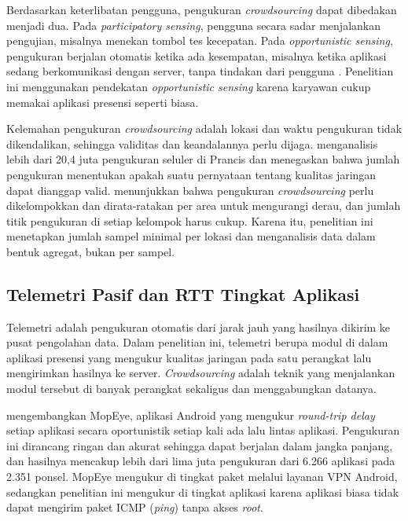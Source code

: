Berdasarkan keterlibatan pengguna, pengukuran \textit{crowdsourcing} dapat dibedakan menjadi dua. Pada \textit{participatory sensing}, pengguna secara sadar menjalankan pengujian, misalnya menekan tombol tes kecepatan. Pada \textit{opportunistic sensing}, pengukuran berjalan otomatis ketika ada kesempatan, misalnya ketika aplikasi sedang berkomunikasi dengan server, tanpa tindakan dari pengguna \parencite{wu2017mopeye}. Penelitian ini menggunakan pendekatan \textit{opportunistic sensing} karena karyawan cukup memakai aplikasi presensi seperti biasa.

Kelemahan pengukuran \textit{crowdsourcing} adalah lokasi dan waktu pengukuran tidak dikendalikan, sehingga validitas dan keandalannya perlu dijaga. \textcite{wamser2021crowd} menganalisis lebih dari 20,4 juta pengukuran seluler di Prancis dan menegaskan bahwa jumlah pengukuran menentukan apakah suatu pernyataan tentang kualitas jaringan dapat dianggap valid. \textcite{tripkovic2021cluster} menunjukkan bahwa pengukuran \textit{crowdsourcing} perlu dikelompokkan dan dirata-ratakan per area untuk mengurangi derau, dan jumlah titik pengukuran di setiap kelompok harus cukup. Karena itu, penelitian ini menetapkan jumlah sampel minimal per lokasi dan menganalisis data dalam bentuk agregat, bukan per sampel.

\subsection{Telemetri Pasif dan RTT Tingkat Aplikasi}
Telemetri adalah pengukuran otomatis dari jarak jauh yang hasilnya dikirim ke pusat pengolahan data. Dalam penelitian ini, telemetri berupa modul di dalam aplikasi presensi yang mengukur kualitas jaringan pada satu perangkat lalu mengirimkan hasilnya ke server. \textit{Crowdsourcing} adalah teknik yang menjalankan modul tersebut di banyak perangkat sekaligus dan menggabungkan datanya.

\textcite{wu2017mopeye} mengembangkan MopEye, aplikasi Android yang mengukur \textit{round-trip delay} setiap aplikasi secara oportunistik setiap kali ada lalu lintas aplikasi. Pengukuran ini dirancang ringan dan akurat sehingga dapat berjalan dalam jangka panjang, dan hasilnya mencakup lebih dari lima juta pengukuran dari 6.266 aplikasi pada 2.351 ponsel. MopEye mengukur di tingkat paket melalui layanan VPN Android, sedangkan penelitian ini mengukur di tingkat aplikasi karena aplikasi biasa tidak dapat mengirim paket ICMP (\textit{ping}) tanpa akses \textit{root}.

